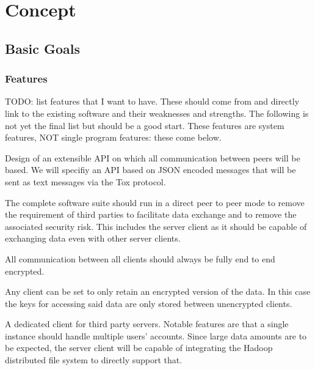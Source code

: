 \chapter{Concept}
\label{chap:concept}


\section{Basic Goals}


\subsection{Features}

TODO: list features that I want to have.
These should come from and directly link to the existing software and their weaknesses and strengths.
The following is not yet the final list but should be a good start.
These features are system features, NOT single program features: these come below.

\begin{description}[leftmargin=2em,style=nextline,noitemsep,nolistsep]
\item[API]
    Design of an extensible API on which all communication between peers will be based.
    We will specifiy an API based on JSON encoded messages that will be sent as text messages via the Tox protocol.
\item[Peer to Peer Architecture]
    The complete software suite should run in a direct peer to peer mode to remove the requirement of third parties to facilitate data exchange and to remove the associated security risk.
    This includes the server client as it should be capable of exchanging data even with other server clients.
\item[Secure Transport]
    All communication between all clients should always be fully end to end encrypted.
\item[Client Encryption]
    Any client can be set to only retain an encrypted version of the data.
    In this case the keys for accessing said data are only stored between unencrypted clients.
\item[Server Client]
    A dedicated client for third party servers.
    Notable features are that a single instance should handle multiple users' accounts.
    Since large data amounts are to be expected, the server client will be capable of integrating the Hadoop distributed file system to directly support that.
\end{description}

